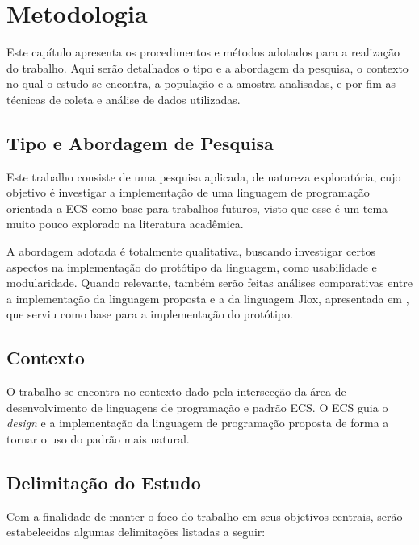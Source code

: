 \chapter{Metodologia}\label{ch:metodologia}

Este capítulo apresenta os procedimentos e métodos adotados para a realização do trabalho. Aqui serão detalhados o tipo e a abordagem da pesquisa, o contexto no qual o estudo se encontra, a população e a amostra analisadas, e por fim as técnicas de coleta e análise de dados utilizadas.

\section{Tipo e Abordagem de Pesquisa}

Este trabalho consiste de uma pesquisa aplicada, de natureza exploratória, cujo objetivo é investigar a implementação de uma linguagem de programação orientada a ECS como base para trabalhos futuros, visto que esse é um tema muito pouco explorado na literatura acadêmica.

A abordagem adotada é totalmente qualitativa, buscando investigar certos aspectos na implementação do protótipo da linguagem, como usabilidade e modularidade. Quando relevante, também serão feitas análises comparativas entre a implementação da linguagem proposta e a da linguagem Jlox, apresentada em , que serviu como base para a implementação do protótipo.

\section{Contexto}

O trabalho se encontra no contexto dado pela intersecção da área de desenvolvimento de linguagens de programação e padrão ECS. O ECS guia o \textit{design} e a implementação da linguagem de programação proposta de forma a tornar o uso do padrão mais natural.

\section{Delimitação do Estudo}

Com a finalidade de manter o foco do trabalho em seus objetivos centrais, serão estabelecidas algumas delimitações listadas a seguir:

